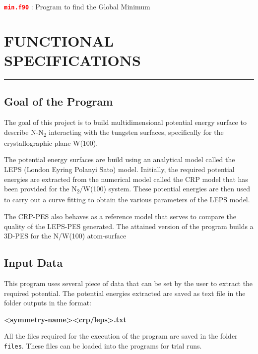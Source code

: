 \documentclass[12pt]{article}
\newcommand{\code}[1]{\colorbox{gray!18}{\texttt{#1}}}
\begin{document}
{\fontsize{10}{6}\textbf{\textcolor{red}{\texttt{min.f90}}}} :  Program to find the Global Minimum


\section{FUNCTIONAL SPECIFICATIONS}
\par\noindent\rule{\textwidth}{0.4pt}

\subsection{Goal of the Program}

The goal of this project is to build multidimensional potential energy surface to describe N-N\textsubscript{2} interacting with the tungsten surfaces, specifically for the crystallographic plane W(100).

The potential energy surfaces are build using an analytical model called the LEPS (London Eyring Polanyi Sato) model. Initially, the required potential energies are extracted from the numerical model called the CRP model that has been provided for the N\textsubscript{{2}}/W(100) system. These potential energies are then used to carry out a curve fitting to obtain the various parameters of the LEPS model. 

The CRP-PES also behaves as a reference model that serves to compare the quality of the LEPS-PES generated. The attained version of the program builds a 3D-PES for the N/W(100) atom-surface
\subsection{ Input Data }

This program uses several piece of data that can be set by the user to extract the required potential. The potential energies extracted are saved as text file in the folder outputs in the format:
\begin{center}
\textbf{<symmetry-name><crp/leps>.txt}  
\end{center} 

All the files required for the execution of the program are saved in the folder {\fontsize{10}{6}\code{files}}. These files can be loaded into the programs for trial runs. 
\end{document}

